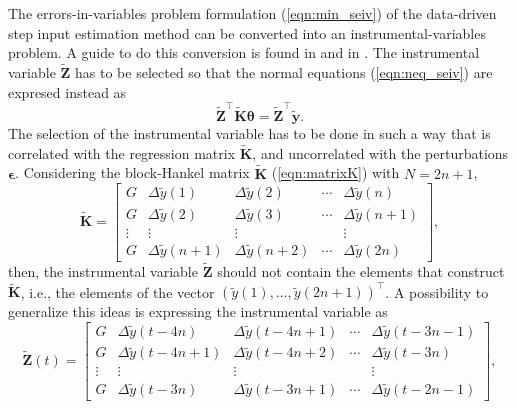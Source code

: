 The errors-in-variables problem formulation (\ref{eqn:min_seiv}) of the data-driven step input estimation method can be converted into an instrumental-variables problem.
A guide to do this conversion is found in \citet{Soderstrom18} and in \citet{Pintelon12Book}. 
The instrumental variable $\widetilde{\mathbf{Z}}$ has to be selected so that the normal equations (\ref{eqn:neq_seiv}) are expresed instead as
\begin{equation} \widetilde{\mathbf{Z}}^\top \widetilde{\mathbf{K}} \bm{\theta} = \widetilde{\mathbf{Z}}^\top \widetilde{\mathbf{y}} . \label{eqn:neq_siv} \end{equation}
The selection of the instrumental variable has to be done in such a way that is correlated with the regression matrix $\widetilde{\mathbf{K}}$, and uncorrelated with the perturbations $\bm{\epsilon}$.
Considering the block-Hankel matrix $\widetilde{\mathbf{K}}$ (\ref{eqn:matrixK}) with $N=2n+1$,
\begin{equation} \widetilde{\mathbf{K}} = \begin{bmatrix} G & \Delta \widetilde{y}(1) & \Delta \widetilde{y}(2) & \cdots & \Delta \widetilde{y}(n) \\ G & \Delta \widetilde{y}(2) & \Delta \widetilde{y}(3) & \cdots & \Delta \widetilde{y}(n+1) \\ \vdots & \vdots & \vdots & & \vdots \\ G & \Delta \widetilde{y}(n+1) & \Delta \widetilde{y}(n+2) & \cdots & \Delta \widetilde{y}(2n) \end{bmatrix} , \label{eqn:matrixK_r} \end{equation}
then, the instrumental variable $\widetilde{\mathbf{Z}}$ should not contain the elements that construct $\widetilde{\mathbf{K}}$, i.e., the elements of the vector $\left( \widetilde{y}(1), \ldots, \widetilde{y}(2n+1) \right)^\top$.
A possibility to generalize this ideas is expressing the instrumental variable as
\begin{equation} \widetilde{\mathbf{Z}}(t) = \begin{bmatrix} G & \Delta \widetilde{y}(t-4n) & \Delta \widetilde{y}(t-4n+1) & \cdots & \Delta \widetilde{y}(t-3n-1) \\ G & \Delta \widetilde{y}(t-4n+1) & \Delta \widetilde{y}(t-4n+2) & \cdots & \Delta \widetilde{y}(t-3n) \\ \vdots & \vdots & \vdots & & \vdots \\ G & \Delta \widetilde{y}(t-3n) & \Delta \widetilde{y}(t-3n+1) & \cdots & \Delta \widetilde{y}(t-2n-1) \end{bmatrix} , \label{eqn:matrixZ_t} \end{equation}
